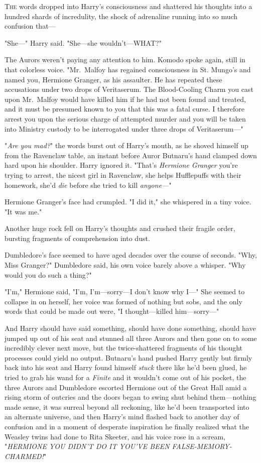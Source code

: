 
\lettrine{T}{he} words dropped into Harry's consciousness and shattered his thoughts into a
hundred shards of incredulity, the shock of adrenaline running into so much
confusion that---

"She---" Harry said. "She---she wouldn't---WHAT?"

The Aurors weren't paying any attention to him. Komodo spoke again, still in
that colorless voice. "Mr.~Malfoy has regained consciousness in St. Mungo's and
named you, Hermione Granger, as his assaulter. He has repeated these
accusations under two drops of Veritaserum. The Blood-Cooling Charm you cast
upon Mr.~Malfoy would have killed him if he had not been found and treated, and
it must be presumed known to you that this was a fatal curse. I therefore
arrest you upon the serious charge of attempted murder and you will be taken
into Ministry custody to be interrogated under three drops of Veritaserum---"

"\emph{Are you mad?}" the words burst out of Harry's mouth, as he shoved
himself up from the Ravenclaw table, an instant before Auror Butnaru's hand
clamped down hard upon his shoulder. Harry ignored it. "That's \emph{Hermione
Granger} you're trying to arrest, the nicest girl in Ravenclaw, she helps
Hufflepuffs with their homework, she'd \emph{die} before she tried to kill
\emph{anyone---}"

Hermione Granger's face had crumpled. "I did it," she whispered in a tiny
voice. "It was me."

Another huge rock fell on Harry's thoughts and crushed their fragile order,
bursting fragments of comprehension into dust.

Dumbledore's face seemed to have aged decades over the course of seconds. "Why,
Miss Granger?" Dumbledore said, his own voice barely above a whisper. "Why
would you do such a thing?"

"I'm," Hermione said, "I'm, I'm---sorry---I don't know why I---" She seemed to
collapse in on herself, her voice was formed of nothing but sobs, and the only
words that could be made out were, "I thought---killed him---sorry---"

And Harry should have said something, should have done something, should have
jumped up out of his seat and stunned all three Aurors and then gone on to some
incredibly clever next move, but the twice-shattered fragments of his thought
processes could yield no output. Butnaru's hand pushed Harry gently but firmly
back into his seat and Harry found himself \emph{stuck} there like he'd been
glued, he tried to grab his wand for a \emph{Finite} and it wouldn't come out
of his pocket, the three Aurors and Dumbledore escorted Hermione out of the
Great Hall amid a rising storm of outcries and the doors began to swing shut
behind them---nothing made sense, it was surreal beyond all reckoning, like
he'd been transported into an alternate universe, and then Harry's mind flashed
back to another day of confusion and in a moment of desperate inspiration he
finally realized what the Weasley twins had done to Rita Skeeter, and his voice
rose in a scream, "\emph{HERMIONE YOU DIDN'T DO IT YOU'VE BEEN
FALSE-MEMORY-CHARMED!}"

